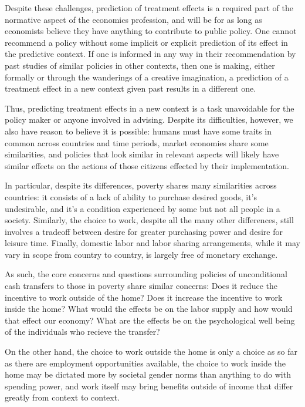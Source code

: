 \documentclass[a4paper,12pt]{article}
\begin{document}
Despite these challenges, prediction of treatment effects is a required part of the normative aspect of the economics profession, and will be for as long as economists believe they have anything to contribute to public policy. One cannot recommend a policy without some implicit or explicit prediction of its effect in the predictive context. If one is informed in any way in their recommendation by past studies of similar policies in other contexts, then one is making, either formally or through the wanderings of a creative imagination, a prediction of a treatment effect in a new context given past results in a different one.

Thus, predicting treatment effects in a new context is a task unavoidable for the policy maker or anyone involved in advising. Despite its difficulties, however, we also have reason to believe it is possible: humans must have some traits in common across countries and time periods, market economies share some similarities, and policies that look similar in relevant aspects will likely have similar effects on the actions of those citizens effected by their implementation.

In particular, despite its differences, poverty shares many similarities across countries: it consists of a lack of ability to purchase desired goods, it's undesirable, and it's a condition experienced by some but not all people in a society. Similarly, the choice to work, despite all the many other differences, still involves a tradeoff between desire for greater purchasing power and desire for leisure time. Finally, domestic labor and labor sharing arrangements, while it may vary in scope from country to country, is largely free of monetary exchange.

As such, the core concerns and questions surrounding policies of unconditional cash transfers to those in poverty share similar concerns: Does it reduce the incentive to work outside of the home? Does it increase the incentive to work inside the home? What would the effects be on the labor supply and how would that effect our economy? What are the effects be on the psychological well being of the individuals who recieve the transfer?

On the other hand, the choice to work outside the home is only a choice as so far as there are employment opportunities available, the choice to work inside the home may be dictated more by societal gender norms than anything to do with spending power, and work itself may bring benefits outside of income that differ greatly from context to context.
\end{document}
